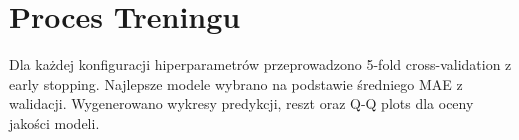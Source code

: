 \section{Proces Treningu}

Dla każdej konfiguracji hiperparametrów przeprowadzono 5-fold cross-validation z early stopping. Najlepsze modele wybrano na podstawie średniego MAE z walidacji. Wygenerowano wykresy predykcji, reszt oraz Q-Q plots dla oceny jakości modeli.
